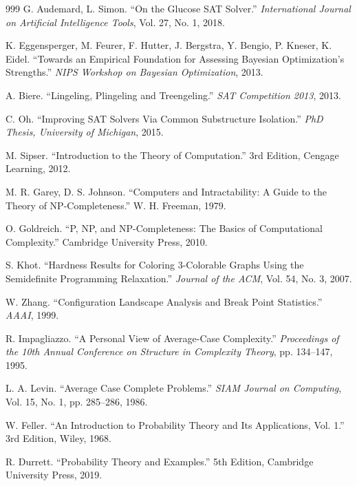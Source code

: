 ﻿\documentclass[a4paper,12pt]{article}
\theoremstyle{definition}
\begin{document}
\begin{thebibliography}{999}
 G. Audemard, L. Simon. ``On the Glucose SAT Solver.'' \textit{International Journal on Artificial Intelligence Tools}, Vol. 27, No. 1, 2018.

 K. Eggensperger, M. Feurer, F. Hutter, J. Bergstra, Y. Bengio, P. Kneser, K. Eidel. ``Towards an Empirical Foundation for Assessing Bayesian Optimization's Strengths.'' \textit{NIPS Workshop on Bayesian Optimization}, 2013.

 A. Biere. ``Lingeling, Plingeling and Treengeling.'' \textit{SAT Competition 2013}, 2013.

 C. Oh. ``Improving SAT Solvers Via Common Substructure Isolation.'' \textit{PhD Thesis, University of Michigan}, 2015.


 M. Sipser. ``Introduction to the Theory of Computation.'' 3rd Edition, Cengage Learning, 2012.

 M. R. Garey, D. S. Johnson. ``Computers and Intractability: A Guide to the Theory of NP-Completeness.'' W. H. Freeman, 1979.

 O. Goldreich. ``P, NP, and NP-Completeness: The Basics of Computational Complexity.'' Cambridge University Press, 2010.

 S. Khot. ``Hardness Results for Coloring 3-Colorable Graphs Using the Semidefinite Programming Relaxation.'' \textit{Journal of the ACM}, Vol. 54, No. 3, 2007.

 W. Zhang. ``Configuration Landscape Analysis and Break Point Statistics.'' \textit{AAAI}, 1999.

 R. Impagliazzo. ``A Personal View of Average-Case Complexity.'' \textit{Proceedings of the 10th Annual Conference on Structure in Complexity Theory}, pp. 134--147, 1995.

 L. A. Levin. ``Average Case Complete Problems.'' \textit{SIAM Journal on Computing}, Vol. 15, No. 1, pp. 285--286, 1986.


 W. Feller. ``An Introduction to Probability Theory and Its Applications, Vol. 1.'' 3rd Edition, Wiley, 1968.

 R. Durrett. ``Probability Theory and Examples.'' 5th Edition, Cambridge University Press, 2019.


\end{thebibliography}
\end{document}
